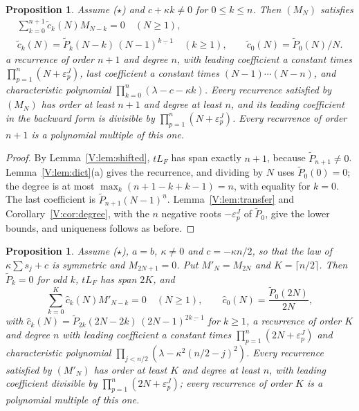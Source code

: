 \documentclass[11pt,a4paper]{article}
\newtheorem{proposition}[theorem]{Proposition}
\theoremstyle{definition}
\theoremstyle{remark}
\newcommand{\cl}[1]{\lceil #1\rceil}
\newcommand{\ff}[2]{#1^{\underline{#2}}}
\numberwithin{equation}{section}
\begin{document}
\begin{proposition}\label{V:prop:shifted}
Assume \textup{($\star$)} and $c+\kappa k\ne0$ for $0\le k\le n$. Then $(M_N)$ satisfies
\[
\begin{gathered}\sum_{k=0}^{n+1}\tilde c_k(N)M_{N-k}=0\quad(N\ge1),\\\tilde c_k(N)=\tilde P_k(N-k)\,\ff{(N-1)}{k-1}\quad(k\ge1),\qquad\tilde c_0(N)=\tilde P_0(N)/N.\end{gathered}
\]
a recurrence of order $n+1$ and degree $n$, with leading coefficient a constant times $\prod_{p=1}^n(N+\varepsilon^J_p)$, last coefficient a constant times $(N-1)\cdots(N-n)$, and characteristic polynomial $\prod_{k=0}^n(\lambda-c-\kappa k)$. Every recurrence satisfied by $(M_N)$ has order at least $n+1$ and degree at least $n$, and its leading coefficient in the backward form is divisible by $\prod_{p=1}^n(N+\varepsilon^J_p)$. Every recurrence of order $n+1$ is a polynomial multiple of this one.
\end{proposition}

\begin{proof}
By Lemma~\ref{V:lem:shifted}, $tL_F$ has span exactly $n+1$, because $\tilde P_{n+1}\ne0$. Lemma~\ref{V:lem:dict}(a) gives the recurrence, and dividing by $N$ uses $\tilde P_0(0)=0$; the degree is at most $\max_k(n+1-k+k-1)=n$, with equality for $k=0$. The last coefficient is $\tilde P_{n+1}\ff{(N-1)}{n}$. Lemma~\ref{V:lem:transfer} and Corollary~\ref{V:cor:degree}, with the $n$ negative roots $-\varepsilon^J_p$ of $\tilde P_0$, give the lower bounds, and uniqueness follows as before.
\end{proof}

\begin{proposition}\label{V:prop:shifted-sym}
Assume \textup{($\star$)}, $a=b$, $\kappa\ne0$ and $c=-\kappa n/2$, so that the law of $\kappa\sum s_j+c$ is symmetric and $M_{2N+1}=0$. Put $M'_N=M_{2N}$ and $K=\cl{n/2}$. Then $\tilde P_k=0$ for odd $k$, $tL_F$ has span $2K$, and
\[
\sum_{k=0}^{K}\hat c_k(N)M'_{N-k}=0\quad(N\ge1),\qquad\hat c_0(N)=\frac{\tilde P_0(2N)}{2N},
\]
with $\hat c_k(N)=\tilde P_{2k}(2N-2k)\,\ff{(2N-1)}{2k-1}$ for $k\ge1$,
a recurrence of order $K$ and degree $n$ with leading coefficient a constant times $\prod_{p=1}^n(2N+\varepsilon^J_p)$ and characteristic polynomial $\prod_{j<n/2}(\lambda-\kappa^2(n/2-j)^2)$. Every recurrence satisfied by $(M'_N)$ has order at least $K$ and degree at least $n$, with leading coefficient divisible by $\prod_{p=1}^n(2N+\varepsilon^J_p)$; every recurrence of order $K$ is a polynomial multiple of this one.
\end{proposition}
\end{document}
